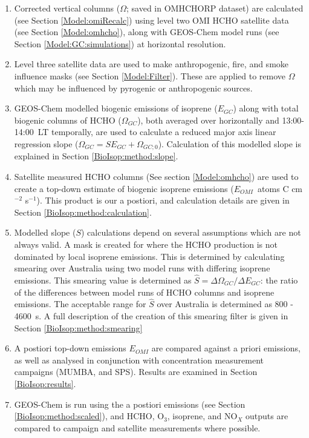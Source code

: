     \begin{enumerate}
      \item 
        Corrected vertical columns ($\Omega$; saved in OMHCHORP dataset) are calculated (see Section \ref{Model:omiRecalc}) using level two OMI HCHO satellite data (see Section \ref{Model:omhcho}), along with GEOS-Chem model runs (see Section \ref{Model:GC:simulations}) at \highhr horizontal resolution.
      \item 
        Level three satellite data are used to make anthropogenic, fire, and smoke influence masks (see Section \ref{Model:Filter}).
        These are applied to remove $\Omega$ which may be influenced by pyrogenic or anthropogenic sources. 
      \item 
        GEOS-Chem modelled biogenic emissions of isoprene ($E_{GC}$) along with total biogenic columns of HCHO ($\Omega_{GC}$), both averaged over \lowhr horizontally and 13:00-14:00~LT temporally, are used to calculate a reduced major axis linear regression slope ($\Omega_{GC}=S E_{GC} + \Omega_{GC;0}$).
        Calculation of this modelled slope is explained in Section \ref{BioIsop:method:slope}.
      \item 
        Satellite measured HCHO columns (See section \ref{Model:omhcho}) are used to create a top-down estimate of biogenic isoprene emissions ($E_{OMI}$~atoms C cm$^{-2}$ s$^{-1}$).
        This product is our a postiori, and calculation details are given in Section \ref{BioIsop:method:calculation}.
      
      \item
        Modelled slope ($S$) calculations depend on several assumptions which are not always valid.
        A mask is created for where the HCHO production is not dominated by local isoprene emissions. 
        This is determined by calculating smearing over Australia using two model runs with differing isoprene emissions.
        This smearing value is determined as $\hat{S}=\Delta \Omega_{GC}/ \Delta E_{GC}$: the ratio of the differences between model runs of HCHO columns and isoprene emissions.
        The acceptable range for $\hat{S}$ over Australia is determined as 800 - 4600~s.
        A full description of the creation of this smearing filter is given in Section \ref{BioIsop:method:smearing}
      \item 
        A postiori top-down emissions $E_{OMI}$ are compared against a priori emissions, as well as analysed in conjunction with concentration measurement campaigns (MUMBA, and SPS).%
        Results are examined in Section \ref{BioIsop:results}.
      \item 
        GEOS-Chem is run using the a postiori emissions (see Section \ref{BioIsop:method:scaled}), and HCHO, O$_3$, isoprene, and NO$_X$ outputs are compared to campaign and satellite measurements where possible.
    \end{enumerate}
    
